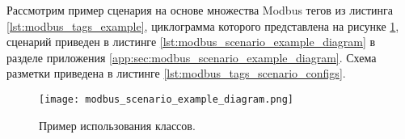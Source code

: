 Рассмотрим пример сценария на основе множества Modbus тегов из листинга \ref{lst:modbus_tags_example},
циклограмма которого представлена на рисунке \ref{fig:modbus_scenario_example_diagram},
сценарий приведен в листинге \ref{lst:modbus_scenario_example_diagram} в разделе приложения \ref{app:sec:modbus_scenario_example_diagram}.
Схема разметки приведена в листинге \ref{lst:modbus_tags_scenario_configs}.

\begin{landscape}
    \begin{center}
        \begin{figure}
            \texttt{[image: modbus\_scenario\_example\_diagram.png]}
            \caption{Пример использования классов.}\label{fig:modbus_scenario_example_diagram}
        \end{figure}
    \end{center}
\end{landscape}
